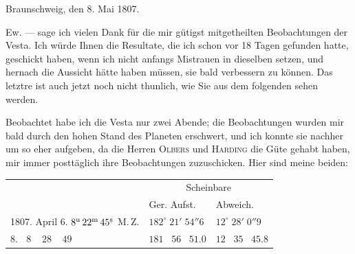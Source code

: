 \begin{flushright}
Braunschweig, den 8. Mai 1807.
\end{flushright}

\par\indent Ew. --- sage ich vielen Dank für die mir gütigst mitgetheilten Beobachtungen der Vesta. Ich
würde Ihnen die Resultate, die ich schon vor 18 Tagen gefunden hatte, geschickt haben, wenn ich
nicht anfangs Mistrauen in dieselben setzen, und hernach die Aussicht hätte haben müssen, sie bald
verbessern zu können. Das letztre ist auch jetzt noch nicht thunlich, wie Sie aus dem folgenden
sehen werden.

\par\indent Beobachtet habe ich die Vesta nur zwei Abende; die Beobachtungen wurden mir bald durch den
hohen Stand des Planeten erschwert, und ich konnte sie nachher um so eher aufgeben, da die Herren
\textsc{Olbers} und \textsc{Harding} die Güte gehabt haben, mir immer posttäglich ihre Beobachtungen zuzuschicken.
Hier sind meine beiden:

\begin{center}\begingroup
\fontsize{9}{11}\selectfont
\setlength{\tabcolsep}{3pt}\renewcommand{\arraystretch}{1.15}
\begin{tabular}{l|l|l}
& \multicolumn{2}{c}{Scheinbare} \\
& Ger. Aufst. \VestaAltarRA{} & Abweich. \VestaAltarDecl{} \\
\hline
1807. April 6. $8^{\mathrm u}\,22^{\mathrm m}\,45^{\rlap{\raisebox{-.32ex}{\hspace{.10em}\rule{.12em}{.28pt}}}\mathrm s}$ M.\,Z. & $182^\circ\;21'\;54''6$ & $12^\circ\;28'\;0''9$ \\
\phantom{1807. April} 8. $\;\;8\;\;\;\;28\;\;\;\;49$ & $181\;\;\;56\;\;\;51.0$ & $12\;\;\;35\;\;\;45.8$ \\
\end{tabular}\endgroup\end{center}

